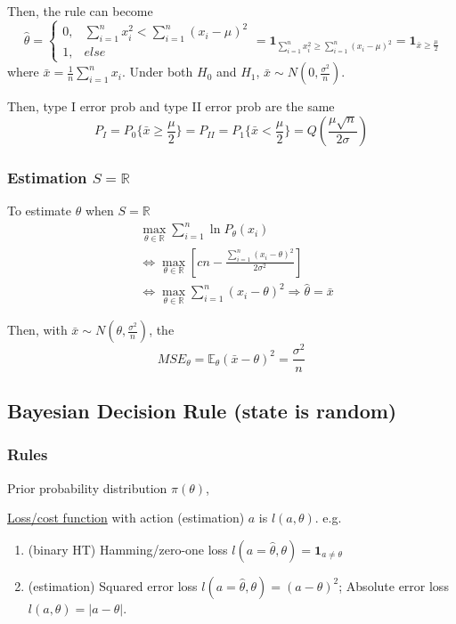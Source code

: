 \documentclass[11pt,a4paper]{article}
\begin{document}
Then, the rule can become $$\hat{\theta}=\left\{\begin{matrix}
    0,&\sum_{i=1}^nx_i^2<\sum_{i=1}^n(x_i-\mu)^2\\
    1,&else
\end{matrix}\right.=\mathbf{1}_{\sum_{i=1}^nx_i^2\geq \sum_{i=1}^n(x_i-\mu)^2}=\mathbf{1}_{\bar{x}\geq \frac{\mu}{2}}$$
where $\bar{x}=\frac{1}{n}\sum_{i=1}^nx_i$. Under both $H_0$ and $H_1$, $\bar{x}\sim N(0,\frac{\sigma^2}{n})$.

Then, type I error prob and type II error prob are the same $$P_I=P_0\{\bar{x}\geq \frac{\mu}{2}\}=P_{II}=P_1\{\bar{x}< \frac{\mu}{2}\}=Q\left(\frac{\mu\sqrt{n}}{2\sigma}\right)$$

\subsubsection*{Estimation $S=\mathbb{R}$}
To estimate $\theta$ when $S=\mathbb{R}$
\begin{equation}
    \begin{aligned}
        &\max_{\theta\in \mathbb{R}}\sum_{i=1}^n\ln P_\theta(x_i)\\
        &\Leftrightarrow \max_{\theta\in \mathbb{R}} \left[cn-\frac{\sum_{i=1}^n(x_i-\theta)^2}{2\sigma^2}\right]\\
        &\Leftrightarrow \max_{\theta\in \mathbb{R}} \sum_{i=1}^n(x_i-\theta)^2 \Rightarrow \hat{\theta}=\bar{x}
    \end{aligned}
    \nonumber
\end{equation}

Then, with $\bar{x}\sim N(\theta,\frac{\sigma^2}{n})$, the $$MSE_\theta=\mathbb{E}_\theta\left(\bar{x}-\theta\right)^2=\frac{\sigma^2}{n}$$

\subsection{Bayesian Decision Rule (state is random)}
\subsubsection{Rules}
Prior probability distribution $\pi(\theta)$,

\underline{Loss/cost function} with action (estimation) $a$ is $l(a,\theta)$. e.g.
\begin{enumerate}
    \item (binary HT) Hamming/zero-one loss $l(a=\hat{\theta},\theta)=\mathbf{1}_{a\neq \theta}$
    \item (estimation) Squared error loss $l(a=\hat{\theta},\theta)=(a-\theta)^2$; Absolute error loss $l(a,\theta)=|a-\theta|$.
\end{enumerate}
\end{document}
